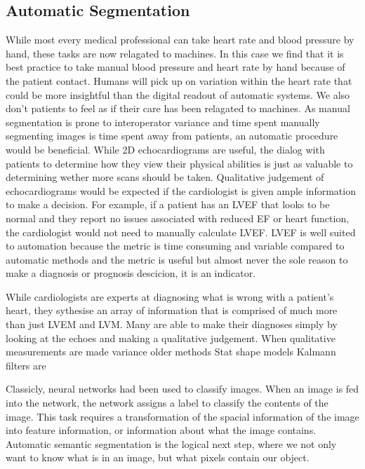 \documentclass[12pt]{article}
\begin{document}
\subsection{Automatic Segmentation}
While most every medical professional can take heart rate and blood pressure by hand, these tasks are now relagated to machines.\cite{pulse oxymmetry bp cuffs}
In this case we find that it is best practice to take manual blood pressure and heart rate by hand because of the patient contact\cite{obs_guidelines}.
Humans will pick up on variation within the heart rate that could be more insightful than the digital readout of automatic systems.
We also don't patients to feel as if their care has been relagated to machines.
As manual segmentation is prone to interoperator variance\cite{jacc_ef_p_and_c} and time spent manually segmenting images is time spent away from patients, an automatic procedure would be beneficial.
While 2D echocardiograms are useful, the dialog with patients to determine how they view their physical abilities is just as valuable to determining wether more scans should be taken.
Qualitative judgement of echocardiograms would be expected if the cardiologist is given ample information to make a decision.
For example, if a patient has an LVEF that looks to be normal and they report no issues associated with reduced EF or heart function, the cardiologist would not need to manually calculate LVEF.
LVEF is well suited to automation because the metric is time consuming and variable compared to automatic methods and the metric is useful but almost never the sole reason to make a diagnosis or prognosis descicion, it is an indicator.

While cardiologists are experts at diagnosing what is wrong with a patient's heart, they sythesise an array of information that is comprised of much more than just LVEM and LVM.
Many are able to make their diagnoses simply by looking at the echoes and making a qualitative judgement.
When qualitative measurements are made
variance
older methods
Stat shape models
Kalmann filters are

Classicly, neural networks had been used to classify images.
When an image is fed into the network, the network assigns a label to classify the contents of the image.
This task requires a transformation of the spacial information of the image into feature information, or information about what the image contains. 
Automatic semantic segmentation is the logical next step, where we not only want to know what is in an image, but what pixels contain our object.
\end{document}
